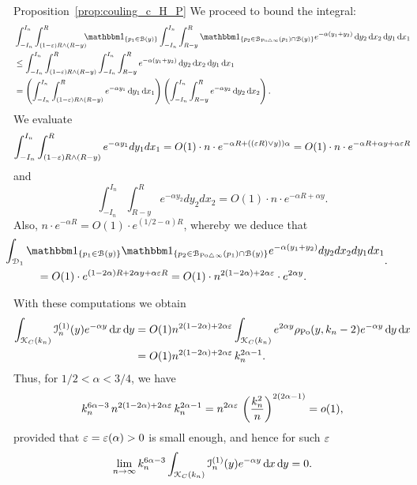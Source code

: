 \begin{proofof}{Proposition~\ref{prop:couling_c_H_P}}
We proceed to bound the integral: 
\begin{align*}
	&\int_{-I_n}^{I_n} \int_{(1-\eps) R \wedge (R-y)}^{R} \hspace{-5pt} \ind{p_1 \in \BallHyp{y}}
		\int_{-I_n}^{I_n} \int_{R - y}^{R } \ind{p_2 \in \BallSym{p_1} \cap \BallHyp{y}} 
		e^{-\alpha(y_1 + y_2)} \dd y_2 \dd x_2 \dd y_1 \dd x_1 \\
	&\leq \int_{-I_n}^{I_n} \int_{(1-\eps) R \wedge (R-y)}^{R} 
		\int_{-I_n}^{I_n} \int_{R - y}^{R}  e^{-\alpha(y_1 + y_2)} \dd y_2 \dd x_2 \dd y_1 \dd x_1\\
	&= \left( \int_{-I_n}^{I_n} \int_{(1-\eps) R \wedge (R-y)}^{R} e^{- \alpha y_1} \dd y_1 \dd x_1 \right) 
	\left(\int_{-I_n}^{I_n} \int_{R - y}^{R}  e^{-\alpha y_2} \dd y_2 \dd x_2 \right).
\end{align*}
We evaluate
$$  \int_{-I_n}^{I_n} \int_{(1-\varepsilon) R \wedge (R-y)}^{R} 
e^{- \alpha y_1} dy_1 dx_1= O(1) \cdot n \cdot e^{-\alpha R + ((\varepsilon R) \vee y))\alpha}
=O(1) \cdot n \cdot e^{-\alpha R + \alpha y + \alpha \varepsilon R }
$$
and 
$$\int_{-I_n}^{I_n} \int_{R - y}^{R}  e^{-\alpha y_2} dy_2 dx_2 
=O(1) \cdot n \cdot e^{-\alpha R +\alpha y}.
$$
Also, $n \cdot e^{-\alpha R} = O(1) \cdot e^{(1/2 -\alpha) R}$, whereby we deduce that 
\begin{equation*}
\begin{split}
&\hspace{-30pt}\int_{\dom{1}} \ind{p_1 \in \BallHyp{y}} \ind{p_2 \in \BallSym{p_1} \cap \BallHyp{y}} 
 e^{-\alpha(y_1 + y_2)} dy_2 dx_2 dy_1 dx_1 \\
&=O(1) \cdot e^{(1-2\alpha)R + 2\alpha y + \alpha \eps R} =O(1) \cdot n^{2(1-2\alpha) + 2\alpha \eps} \cdot e^{2\alpha y}.
\end{split}.
\end{equation*}

With these computations we obtain
\begin{align*} 
	\int_{{\mathcal K}_{C}(k_n)} \mathcal{I}_n^{(1)}(y) e^{-\alpha y} \operatorname{\mathrm{d}\hspace{-2pt}} x \operatorname{\mathrm{d}\hspace{-2pt}} y
	&= O(1) n^{2(1-2\alpha) + 2\alpha \varepsilon}
		\int_{{\mathcal K}_{C}(k_n)} e^{2\alpha y} \rho_{{\mathrm{Po}}}(y,k_n-2) e^{-\alpha y} \operatorname{\mathrm{d}\hspace{-2pt}} y \operatorname{\mathrm{d}\hspace{-2pt}} x \\ 
	&=O(1) n^{2(1-2\alpha) + 2\alpha \varepsilon} \, k_n^{2\alpha - 1}.
\end{align*}
Thus, for $1/2 < \alpha < 3/4$, we have 
\begin{equation*}
k_n^{6 \alpha -3} \,  n^{2(1-2\alpha) + 2\alpha \varepsilon} \, k_n^{2\alpha -1} = 
n^{2\alpha \varepsilon} \, \left( \frac{k_n^2}{n} \right)^{2(2\alpha -1)} = o(1), 
\end{equation*}
provided that $\varepsilon = \varepsilon (\alpha)>0$ is small enough, and hence for such $\varepsilon$
\[
	\lim_{n \to \infty} k_n^{6\alpha - 3} \int_{{\mathcal K}_{C}(k_n)} \mathcal{I}_n^{(1)}(y) e^{-\alpha y} \operatorname{\mathrm{d}\hspace{-2pt}} x \operatorname{\mathrm{d}\hspace{-2pt}} y = 0.
\]


\end{proofof}
